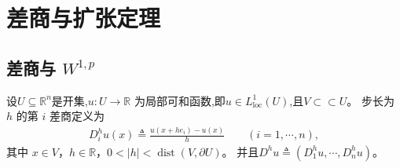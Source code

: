 \documentclass[../../main.tex]{subfiles}
\begin{document}
\section{差商与扩张定理}\label{section:ch05-延拓}

\subsection{差商与 $W^{1,p}$}\label{subsubsection:ch05-差商W1p}

\begin{definition}\label{definition:ch05-差商}
设$U\subseteq \mathbb{R}^n$是开集,$u:U\to\mathbb{R}$ 为局部可和函数,即$u\in L_{\text{loc}}^1(U)$,且$V\subset \subset U$。
步长为 $h$ 的第 $i$ 差商定义为
\begin{align*}
D_{i}^{h}u(x)\triangleq \frac{u(x+he_{i})-u(x)}{h}\qquad (i=1,\cdots,n),
\end{align*}
其中 $x\in V$，$h\in\mathbb{R}$，$0<|h|<\operatorname{dist}(V,\partial U)$。
并且$D^{h}u\triangleq(D_{1}^{h}u,\cdots,D_{n}^{h}u)$。
\end{definition}
\end{document}
